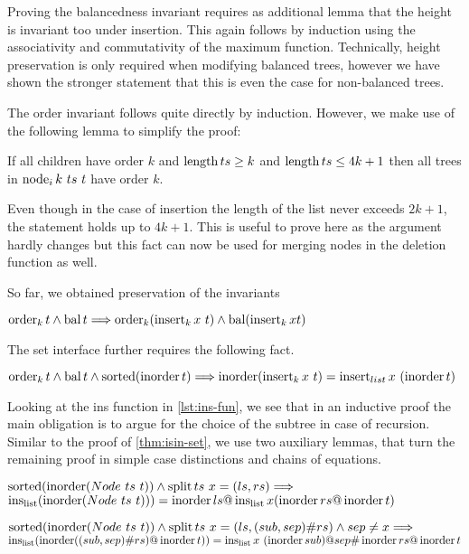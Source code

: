 Proving the balancedness invariant requires as additional lemma that
the height is invariant too under insertion.
This again follows by induction using the
associativity and commutativity of the maximum function.
Technically, height preservation is only required when modifying balanced
trees, however we have shown the stronger statement that this is even the case for non-balanced trees.

The order invariant follows quite directly by induction.
However, we make use of the following lemma to simplify the proof:

\begin{lemma}
    If all children have order $k$ and $\operatorname{length} ts \ge k$ and $\operatorname{length} ts \le 4k+1$
    then all trees in $\operatorname{node}_i k\ ts\ t$ have order $k$.
\end{lemma}

Even though in the case of insertion the length of the list
never exceeds $2k+1$, the statement holds up to $4k+1$.
This is useful to prove here as the argument hardly changes
but this fact can now be used for merging nodes in the deletion function as well.

So far, we obtained preservation of the invariants
\begin{theorem}
    $\operatorname{order}_k t \wedge \operatorname{bal} t \Longrightarrow
    \operatorname{order}_k (\operatorname{insert}_k x\ t) \wedge \operatorname{bal} (\operatorname{insert}_k x t)$
\end{theorem}

The set interface further requires the following fact.
\begin{theorem}
    $\operatorname{order}_k t \wedge \operatorname{bal} t \wedge \operatorname{sorted}  (\operatorname{inorder} t)\Longrightarrow
    \operatorname{inorder} (\operatorname{insert}_k x\ t) = \operatorname{insert}_{list} x\ (\operatorname{inorder} t)$
\end{theorem}

Looking at the ins function in \autoref{lst:ins-fun},
we see that in an inductive proof the main obligation
is to argue for the choice of the subtree in case of recursion.
Similar to the proof of \autoref{thm:isin-set},
we use two auxiliary lemmas, that turn the remaining
proof in simple case distinctions and chains of equations.

\begin{lemma}
    $\operatorname{sorted}(\operatorname{inorder} (Node\ ts\ t)) \wedge \operatorname{split} ts\ x = (ls, rs) \Longrightarrow$ \\
    $\operatorname{ins_{list}} (\operatorname{inorder} (Node\ ts\ t))) = \operatorname{inorder} ls @ \operatorname{ins_{list}} x (\operatorname{inorder} rs @ \operatorname{inorder} t)$
\end{lemma}

\begin{lemma}
    $\operatorname{sorted} (\operatorname{inorder} (Node\ ts\ t)) \wedge \operatorname{split} ts\ x = (ls, (sub,sep)\#rs) \wedge sep \neq x \Longrightarrow$ \\
    $\operatorname{ins_{list}} (\operatorname{inorder} ((sub,sep)\#rs) @ \operatorname{inorder} t)) = \operatorname{ins_{list}} x\ (\operatorname{inorder} sub) @ sep \# \operatorname{inorder} rs @ \operatorname{inorder} t$
\end{lemma}

